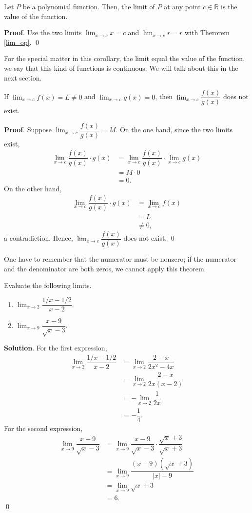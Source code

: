 \documentclass[11pt]{book}
\theoremstyle{break}
\theoremstyle{no_label}
\newcommand{\bbR}{\mathbb{R}}
\numberwithin{equation}{section}
\begin{document}
\begin{corollary}
    Let $P$ be a polynomial function. Then, the limit of $P$ at any point $c\in\bbR$ is the value of the function.
\end{corollary}
\textbf{Proof}. Use the two limits $\displaystyle\lim_{x\to c}x=c$ and $\displaystyle\lim_{x\to c}r=r$ with Therorem \ref{lim_op}. \qed

For the special matter in this corollary, the limit equal the value of the function, we say that this kind of functions is continuous. We will talk about this in the next section.

\begin{theorem}
    If $\displaystyle\lim_{x\to c}f(x)=L\ne 0$ and $\displaystyle\lim_{x\to c}g(x)=0$, then $\displaystyle\lim_{x\to c}\dfrac{f(x)}{g(x)}$ does not exist.
\end{theorem}
\textbf{Proof}. Suppose $\displaystyle\lim_{x\to c}\dfrac{f(x)}{g(x)}=M$. On the one hand, since the two limits exist, \begin{align*}
    \lim_{x\to c}\dfrac{f(x)}{g(x)}\cdot g(x)&=\lim_{x\to c}\dfrac{f(x)}{g(x)}\cdot\lim_{x\to c}g(x)\\
    &=M\cdot 0\\
    &=0.
\end{align*} On the other hand, \begin{align*}
    \lim_{x\to c}\dfrac{f(x)}{g(x)}\cdot g(x)&=\lim_{x\to c}f(x)\\
    &=L\\
    &\ne0,
\end{align*} a contradiction. Hence, $\displaystyle\lim_{x\to c}\dfrac{f(x)}{g(x)}$ does not exist. \qed

One have to remember that the numerator must be nonzero; if the numerator and the denominator are both zeros, we cannot apply this theorem.

\begin{example}
    Evaluate the following limits.
    \begin{enumerate}
        \item $\displaystyle\lim_{x\to 2}\dfrac{1/x-1/2}{x-2}$.
        \item $\displaystyle\lim_{x\to 9}\dfrac{x-9}{\sqrt{x}-3}$.
    \end{enumerate}
\end{example}
\textbf{Solution}. For the first expression, \begin{align*}
    \lim_{x\to 2}\dfrac{1/x-1/2}{x-2}&=\lim_{x\to 2}\dfrac{2-x}{2x^2-4x}\\
    &=\lim_{x\to 2}\dfrac{2-x}{2x(x-2)}\\
    &=-\lim_{x\to 2}\dfrac{1}{2x}\\
    &=-\dfrac{1}{4}.
\end{align*} For the second expression, \begin{align*}
    \lim_{x\to 9}\dfrac{x-9}{\sqrt{x}-3}&=\lim_{x\to 9}\dfrac{x-9}{\sqrt{x}-3}\cdot\dfrac{\sqrt{x}+3}{\sqrt{x}+3}\\
    &=\lim_{x\to 9}\dfrac{(x-9)(\sqrt{x}+3)}{|x|-9}\\
    &=\lim_{x\to 9}\sqrt{x}+3\\
    &=6.
\end{align*} \qed
\end{document}
